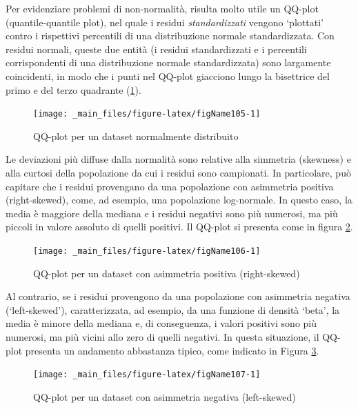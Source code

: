\documentclass[a4paper,12pt,oneside]{book}
\begin{document}
Per evidenziare problemi di non-normalità, risulta molto utile un QQ-plot (quantile-quantile plot), nel quale i residui \emph{standardizzati} vengono `plottati' contro i rispettivi percentili di una distribuzione normale standardizzata. Con residui normali, queste due entità (i residui standardizzati e i percentili corrispondenti di una distribuzione normale standardizzata) sono largamente coincidenti, in modo che i punti nel QQ-plot giacciono lungo la bisettrice del primo e del terzo quadrante (\ref{fig:figName105}).

\begin{figure}

{\centering \texttt{[image: \_main\_files/figure-latex/figName105-1]} 

}

\caption{QQ-plot per un dataset normalmente distribuito}\label{fig:figName105}
\end{figure}

Le deviazioni più diffuse dalla normalità sono relative alla simmetria (skewness) e alla curtosi della popolazione da cui i residui sono campionati. In particolare, può capitare che i residui provengano da una popolazione con asimmetria positiva (right-skewed), come, ad esempio, una popolazione log-normale. In questo caso, la media è maggiore della mediana e i residui negativi sono più numerosi, ma più piccoli in valore assoluto di quelli positivi. Il QQ-plot si presenta come in figura \ref{fig:figName106}.

\begin{figure}

{\centering \texttt{[image: \_main\_files/figure-latex/figName106-1]} 

}

\caption{QQ-plot per un dataset con asimmetria positiva (right-skewed)}\label{fig:figName106}
\end{figure}

Al contrario, se i residui provengono da una popolazione con asimmetria negativa (`left-skewed'), caratterizzata, ad esempio, da una funzione di densità `beta', la media è minore della mediana e, di conseguenza, i valori positivi sono più numerosi, ma più vicini allo zero di quelli negativi. In questa situazione, il QQ-plot presenta un andamento abbastanza tipico, come indicato in Figura \ref{fig:figName107}.

\begin{figure}

{\centering \texttt{[image: \_main\_files/figure-latex/figName107-1]} 

}

\caption{QQ-plot per un dataset con asimmetria negativa (left-skewed)}\label{fig:figName107}
\end{figure}
\end{document}

